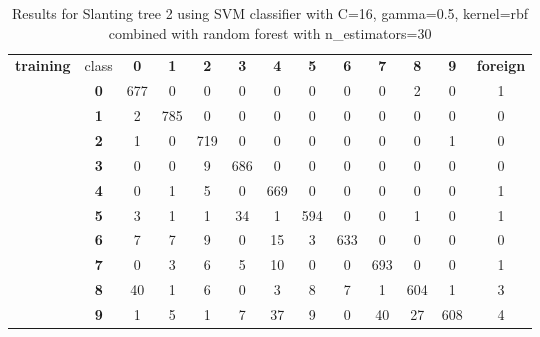 \begin{table}[htp]
	\centering
	\caption{Results for Slanting tree 2 using SVM classifier with C=16, gamma=0.5, kernel=rbf combined with random forest with n\_estimators=30}
	\label{slanting_tree2_svm_results}
	\begin{tabular}{|c|c|c|c|c|c|c|c|c|c|c|c|c|}
		\hline
		\multirow{11}{*}{\textbf{training}} & class      & \textbf{0} & \textbf{1} & \textbf{2} & \textbf{3} & \textbf{4} & \textbf{5} & \textbf{6} & \textbf{7} & \textbf{8} & \textbf{9} & \textbf{foreign} \\ \cline{2-13} 
		& \textbf{0} & 677        & 0          & 0          & 0          & 0          & 0          & 0          & 0          & 2          & 0          & 1                \\ \cline{2-13} 
		& \textbf{1} & 2          & 785        & 0          & 0          & 0          & 0          & 0          & 0          & 0          & 0          & 0                \\ \cline{2-13} 
		& \textbf{2} & 1          & 0          & 719        & 0          & 0          & 0          & 0          & 0          & 0          & 1          & 0                \\ \cline{2-13} 
		& \textbf{3} & 0          & 0          & 9          & 686        & 0          & 0          & 0          & 0          & 0          & 0          & 0                \\ \cline{2-13} 
		& \textbf{4} & 0          & 1          & 5          & 0          & 669        & 0          & 0          & 0          & 0          & 0          & 1                \\ \cline{2-13} 
		& \textbf{5} & 3          & 1          & 1          & 34         & 1          & 594        & 0          & 0          & 1          & 0          & 1                \\ \cline{2-13} 
		& \textbf{6} & 7          & 7          & 9          & 0          & 15         & 3          & 633        & 0          & 0          & 0          & 0                \\ \cline{2-13} 
		& \textbf{7} & 0          & 3          & 6          & 5          & 10         & 0          & 0          & 693        & 0          & 0          & 1                \\ \cline{2-13} 
		& \textbf{8} & 40         & 1          & 6          & 0          & 3          & 8          & 7          & 1          & 604        & 1          & 3                \\ \cline{2-13} 
		& \textbf{9} & 1          & 5          & 1          & 7          & 37         & 9          & 0          & 40         & 27         & 608        & 4                \\ \hline

\end{tabular}
\end{table}
